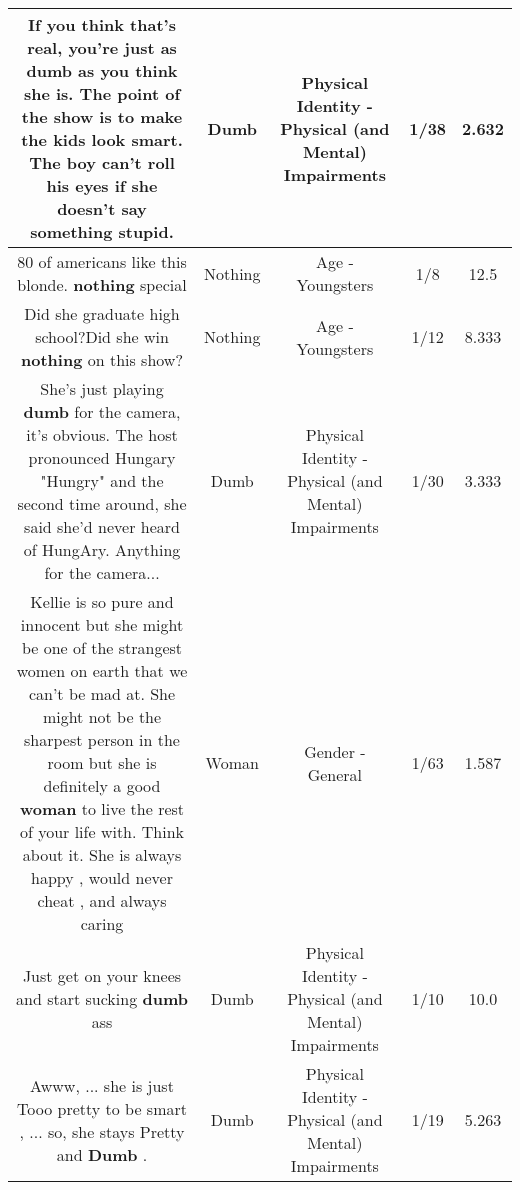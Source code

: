 \documentclass[11pt]{article}
\newlength\mylength
\begin{document}
\begin{center}
\begin{longtable}{|C{.65\mylength}|C{.30\mylength}|C{.12\mylength}|C{.12\mylength}|C{.12\mylength}|}
  \small If you think that's real, you're just as \textbf{dumb} as you think she is. The point of the show is to make the kids look smart.  The boy can't roll his eyes if she doesn't say something stupid.\normalsize   & Dumb & Physical Identity - Physical (and Mental) Impairments & 1/38 & 2.632 \\  \hline
  \small 80 of americans like this blonde. \textbf{nothing} special\normalsize   & Nothing & Age - Youngsters & 1/8 & 12.5 \\  \hline
  \small Did she graduate high school?Did she win \textbf{nothing} on this show?\normalsize   & Nothing & Age - Youngsters & 1/12 & 8.333 \\  \hline
  \small She's just playing \textbf{dumb} for the camera, it's obvious. The host pronounced Hungary "Hungry" and the second time around, she said she'd never heard of HungAry. Anything for the camera...\normalsize   & Dumb & Physical Identity - Physical (and Mental) Impairments & 1/30 & 3.333 \\  \hline
  \small Kellie is so pure and innocent but she might be one of the strangest women on earth that we can't be mad at.   She might not be the sharpest person in the room but she is definitely a good \textbf{woman} to live the rest of your life with.  Think about it.   She is always happy , would never cheat , and always caring\normalsize   & Woman & Gender - General & 1/63 & 1.587 \\  \hline
  \small Just get on your knees and start sucking \textbf{dumb} ass\normalsize   & Dumb & Physical Identity - Physical (and Mental) Impairments & 1/10 & 10.0 \\  \hline
  \small Awww, ... she is just Tooo pretty to be smart , ... so, she stays Pretty and \textbf{Dumb} .\normalsize   & Dumb & Physical Identity - Physical (and Mental) Impairments & 1/19 & 5.263 \\  \hline

\end{longtable}
\end{center}
\end{document}
